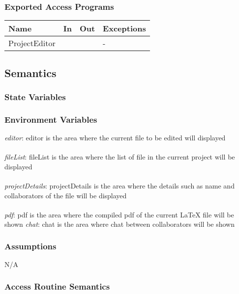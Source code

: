 \documentclass[12pt, titlepage]{article}
\begin{document}
	\subsubsection{Exported Access Programs}
	
	\begin{center}
		\begin{tabular}{p{2cm} p{4cm} p{4cm} p{2cm}}
			\hline
			\textbf{Name} & \textbf{In} & \textbf{Out} & \textbf{Exceptions} \\
			\hline
			ProjectEditor &  &  & - \\
			\hline
		\end{tabular}
	\end{center}
	
	\subsection{Semantics}
	
	\subsubsection{State Variables}
	
	
	\subsubsection{Environment Variables}
	
	\textit{editor}: editor is the area where the current file to be edited will displayed \\\\ 
	\textit{fileList}: fileList is the area where the list of file in the current project will be displayed \\\\
	\textit{projectDetails}: projectDetails is the area where the details such as name and collaborators of the file will be displayed \\\\
	\textit{pdf}: pdf is the area where the compiled pdf of the current LaTeX file will be shown \textit{chat}: chat is the area where chat between collaborators will be shown 
	
	\subsubsection{Assumptions}
	N/A
	
	\subsubsection{Access Routine Semantics}
	
\end{document}
